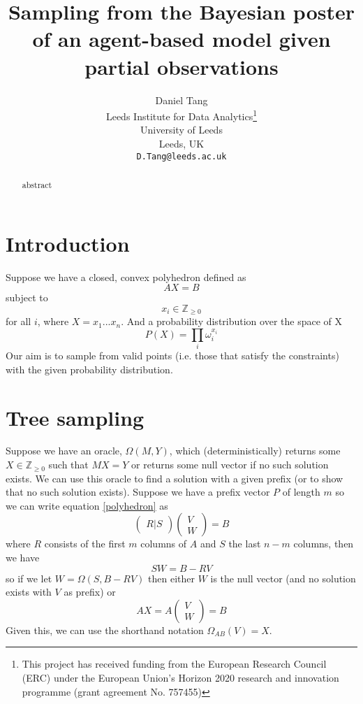 \documentclass{article}
\title{Sampling from the Bayesian poster of an agent-based model given partial observations}
\author{
  Daniel Tang\\
  Leeds Institute for Data Analytics\thanks{This project has received funding from the European Research Council (ERC) under the European Union’s Horizon 2020 research and innovation programme (grant agreement No. 757455)}\\
  University of Leeds\\
  Leeds, UK\\
  \texttt{D.Tang@leeds.ac.uk} \\
}
\begin{document}
\maketitle

\begin{abstract}
abstract
\end{abstract}


\section{Introduction}

Suppose we have a closed, convex polyhedron defined as
\begin{equation}
AX = B
\label{polyhedron}
\end{equation}
subject to
\[
x_i \in \mathbb{Z}_{\ge 0}
\]
for all $i$, where $X = x_1...x_n$. And a probability distribution over the space of X
\begin{equation}
P(X) = \prod_i \omega_i^{x_i}
\label{probability}
\end{equation}
Our aim is to sample from valid points (i.e. those that satisfy the constraints) with the given probability distribution.

\section{Tree sampling}
Suppose we have an oracle, $\Omega(M,Y)$, which (deterministically) returns some $X\in \mathbb{Z}_{\ge0}$ such that $MX=Y$ or returns some null vector if no such solution exists. We can use this oracle to find a solution with a given prefix (or to show that no such solution exists). Suppose we have a prefix vector $P$ of length $m$ so we can write equation \ref{polyhedron} as
\[
\begin{pmatrix}
R|S
\end{pmatrix}
\begin{pmatrix}
V \\
W 
\end{pmatrix}
= B
\]
where $R$ consists of the first $m$ columns of $A$ and $S$ the last $n-m$ columns, then we have
\[
SW = B - RV
\]
so if we let $W = \Omega(S,B-RV)$ then either $W$ is the null vector (and no solution exists with $V$ as prefix) or
\[
AX = A\begin{pmatrix}
V \\
W 
\end{pmatrix}
= B
\]
Given this, we can use the shorthand notation $\Omega_{AB}(V) = X$.
\end{document}

